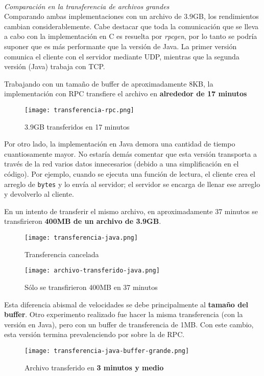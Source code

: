 ~\\
\emph{Comparación en la transferencia de archivos grandes} 
~\\

Comparando ambas implementaciones con un archivo de 3.9GB, los rendimientos cambian considerablemente. Cabe destacar que toda la comunicación que se lleva a cabo con la implementación en C es resuelta por \emph{rpcgen}, por lo tanto se podría suponer que es más performante que la versión de Java. La primer versión comunica el cliente con el servidor mediante UDP, mientras que la segunda versión (Java) trabaja con TCP.

Trabajando con un tamaño de buffer de aproximadamente 8KB, la implementación con RPC transfiere el archivo en \textbf{alrededor de 17 minutos} 

\begin{figure}[h]
    \centering
    \texttt{[image: transferencia-rpc.png]}
    \caption{3.9GB transferidos en 17 minutos}
\end{figure}

Por otro lado, la implementación en Java demora una cantidad de tiempo cuantiosamente mayor. No estaría demás comentar que esta versión transporta a través de la red varios datos innecesarios (debido a una simplificación en el código). Por ejemplo, cuando se ejecuta una función de lectura, el cliente crea el arreglo de \texttt{bytes} y lo envía al servidor; el servidor se encarga de llenar ese arreglo y devolverlo al cliente. 

En un intento de transferir el mismo archivo, en aproximadamente 37 minutos se transfirieron \textbf{400MB de un archivo de 3.9GB}.

\begin{figure}[h]
    \centering
    \texttt{[image: transferencia-java.png]}
    \caption{Transferencia cancelada}
\end{figure}
\begin{figure}[h]
    \centering
    \texttt{[image: archivo-transferido-java.png]}
    \caption{Sólo se transfirieron 400MB en 37 minutos}
\end{figure}

Esta diferencia abismal de velocidades se debe principalmente al \textbf{tamaño del buffer}. Otro experimento realizado fue hacer la misma transferencia (con la versión en Java), pero con un buffer de transferencia de 1MB. Con este cambio, esta versión termina prevalenciendo por sobre la de RPC.

\begin{figure}[H]
    \centering
    \texttt{[image: transferencia-java-buffer-grande.png]}
    \caption{Archivo transferido en \textbf{3 minutos y medio} }
\end{figure}


